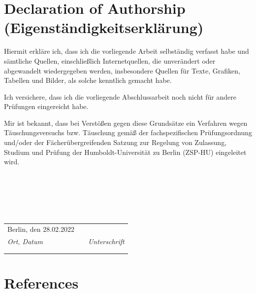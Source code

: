 \documentclass[12pt,twoside]{reedthesis}
\begin{document}
\newpage

\onehalfspacing

\hypertarget{declaration-of-authorship-eigenstuxe4ndigkeitserkluxe4rung}{%
\chapter*{Declaration of Authorship (Eigenständigkeitserklärung)}\label{declaration-of-authorship-eigenstuxe4ndigkeitserkluxe4rung}}

Hiermit erkläre ich, dass ich die vorliegende Arbeit selbständig verfasst habe und sämtliche Quellen, einschließlich Internetquellen, die unverändert oder abgewandelt wiedergegeben werden, insbesondere Quellen für Texte, Grafiken, Tabellen und Bilder, als solche kenntlich gemacht habe.

Ich versichere, dass ich die vorliegende Abschlussarbeit noch nicht für andere Prüfungen eingereicht habe.

Mir ist bekannt, dass bei Verstößen gegen diese Grundsätze ein Verfahren wegen Täuschungsversuchs bzw. Täuschung gemäß der fachspezifischen Prüfungsordnung und/oder der Fächerübergreifenden Satzung zur Regelung von Zulassung, Studium und Prüfung der Humboldt-Universität zu Berlin (ZSP-HU) eingeleitet wird.

\hfill\break
~

\hfill\break
~

\hfill\break
~
\begin{tabular}{m{6cm}m{2cm}m{6cm}}
Berlin, den 28.02.2022 &  &              \\ \cline{1-1} \cline{3-3} 
\textit{Ort, Datum}            &  & \textit{Unterschrift} \\
                       &  &              \\
                       &  &             
\end{tabular}
\backmatter

\hypertarget{references}{%
\chapter*{References}\label{references}}


\noindent

\setlength{\parindent}{-0.20in}
\end{document}
